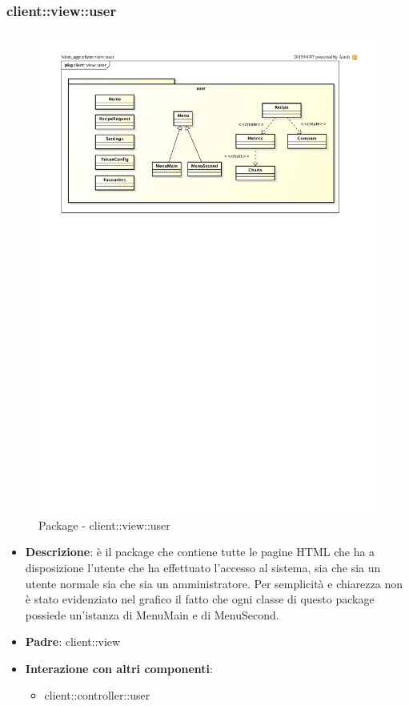 \subsubsection{client::view::user} %
\label{ssub:bdsm_app_client_view_user}
\begin{figure}[htbp]
	\centering
	\centerline{\includegraphics[scale=0.8]{./images/client/client_view_user.pdf}}
	\caption{Package - client::view::user}
\end{figure}

\begin{itemize}
	\item \textbf{Descrizione}: è il package che contiene tutte le pagine HTML che ha a disposizione l'utente che ha effettuato l'accesso al sistema, sia che sia un utente normale sia che sia un amministratore. \newline
	Per semplicità e chiarezza non è stato evidenziato nel grafico il fatto che ogni classe di questo package possiede un'istanza di MenuMain e di MenuSecond.
	\item \textbf{Padre}: client::view
	\item \textbf{Interazione con altri componenti}:
		\begin{itemize}
			\item client::controller::user
		\end{itemize}
\end{itemize}

